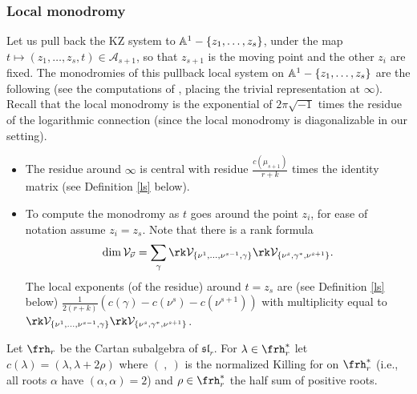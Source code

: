 \subsubsection{Local monodromy}\label{clarinet}
Let us pull back the KZ system to $\Bbb{A}^1-\{z_1,\dots,z_s\}$, under the map $t\mapsto (z_1,\dots,z_s,t)\in\mathcal{A}_{s+1}$, so that $z_{s+1}$ is the moving point and the other $z_i$ are fixed. The monodromies of this pullback local system
on  $\Bbb{A}^1-\{z_1,\dots,z_s\}$ are the following (see the computations of \cite[Section 3.1]{naf}, placing the trivial representation at $\infty$). Recall that the local monodromy is  the exponential of $2\pi\sqrt{-1}$ times the residue of the logarithmic connection (since the local monodromy is diagonalizable in our setting).
\begin{itemize}
\item[-] The residue around $\infty$ is central with residue  $\frac{c(\mu_{s+1})}{r+k}$ times the identity matrix (see Definition  \ref{ls} below).
\item[-] To compute the monodromy as $t$ goes around the point $z_i$, for ease of notation assume $z_i=z_s$. Note that there is a rank formula
$$ \dim \mathcal{V}_{\vec{\nu}}=\sum_{\gamma}\rk \mathcal{V}_{\{\nu^1,\dots,\nu^{s-1},\gamma\}} \rk \mathcal{V}_{\{\nu^s,\gamma^*,\nu^{s+1}\}}.$$
The local exponents (of the residue)  around $t=z_s$ are (see Definition  \ref{ls} below)  $\frac{1}{2(r+k)}(c(\gamma)-c(\nu^s)-c(\nu^{s+1}))$ with multiplicity equal to $\rk \mathcal{V}_{\{\nu^1,\dots,\nu^{s-1},\gamma\}} \rk \mathcal{V}_{\{\nu^s,\gamma^*,\nu^{s+1}\}}$.
\end{itemize}


\begin{defi}
\notready\label{ls} Let $\frh_r$  be the Cartan subalgebra of $\mathfrak{sl}_r$. For $\lambda\in\frh_r^*$ let
$c(\lambda)=(\lambda,\lambda+2\rho)$ where $(\ ,\ )$ is the normalized Killing for on $\frh_r^*$ (i.e., all roots $\alpha$ have $(\alpha,\alpha)=2$)  and $\rho\in\frh_r^*$ the half sum of positive roots.
\end{defi}
